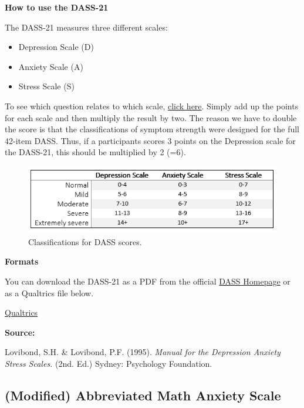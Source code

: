 \documentclass[
]{book}
\providecommand{\tightlist}{%
  \setlength{\itemsep}{0pt}\setlength{\parskip}{0pt}}
\begin{document}
\textbf{How to use the DASS-21}

The DASS-21 measures three different scales:

\begin{itemize}
\tightlist
\item
  Depression Scale (D)
\item
  Anxiety Scale (A)
\item
  Stress Scale (S)
\end{itemize}

To see which question relates to which scale, \href{link}{click here}. Simply add up the points for each scale and then multiply the result by two. The reason we have to double the score is that the classifications of symptom strength were designed for the full 42-item DASS. Thus, if a participants scores 3 points on the Depression scale for the DASS-21, this should be multiplied by 2 (=6).

\begin{figure}

{\centering \includegraphics[width=0.8\linewidth]{images/DASS_Scoring} 

}

\caption{Classifications for DASS scores.}\label{fig:Figure8-1}
\end{figure}

\textbf{Formats}

You can download the DASS-21 as a PDF from the official \href{http://www2.psy.unsw.edu.au/groups/dass/}{DASS Homepage} or as a Qualtrics file below.

\href{questionnaires/DASS-21.qsf}{Qualtrics}

\textbf{Source:}

Lovibond, S.H. \& Lovibond, P.F. (1995). \emph{Manual for the Depression Anxiety Stress Scales.} (2nd. Ed.) Sydney: Psychology Foundation.

\hypertarget{modified-abbreviated-math-anxiety-scale}{%
\subsection{(Modified) Abbreviated Math Anxiety Scale}\label{modified-abbreviated-math-anxiety-scale}}
\end{document}
